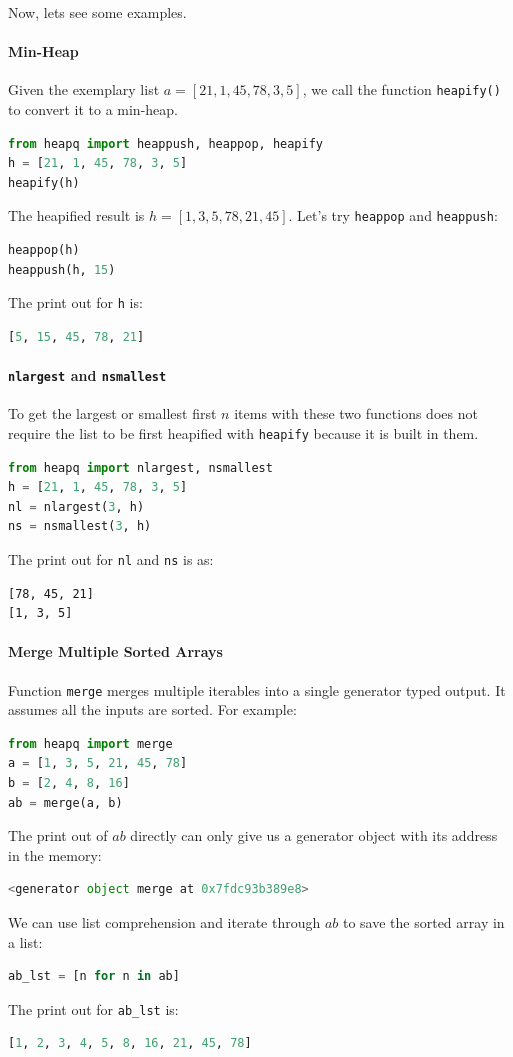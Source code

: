 \documentclass[../main.tex]{subfiles}
\begin{document}
Now, lets see some examples. 
\paragraph{Min-Heap} Given the exemplary list $a =[21, 1, 45, 78, 3, 5]$, we call the function \texttt{heapify()} to convert it to a min-heap. 
\begin{lstlisting}[language = Python]
from heapq import heappush, heappop, heapify
h = [21, 1, 45, 78, 3, 5]
heapify(h)
\end{lstlisting}
The heapified result is $h=[1, 3, 5, 78, 21, 45]$. Let's try \texttt{heappop} and \texttt{heappush}:
\begin{lstlisting}[language=Python]
heappop(h)
heappush(h, 15)
\end{lstlisting}
The print out for \texttt{h} is:
\begin{lstlisting}[language=Python]
[5, 15, 45, 78, 21]
\end{lstlisting}

\paragraph{\texttt{nlargest} and \texttt{nsmallest}}
To get the largest or smallest first $n$ items with these two functions does not require the list to be first heapified with \texttt{heapify} because it is built in them.
\begin{lstlisting}[language=Python]
from heapq import nlargest, nsmallest
h = [21, 1, 45, 78, 3, 5]
nl = nlargest(3, h)
ns = nsmallest(3, h)
\end{lstlisting}
The print out for \texttt{nl} and \texttt{ns} is as:
\begin{lstlisting}
[78, 45, 21]
[1, 3, 5]
\end{lstlisting}

\paragraph{Merge Multiple Sorted Arrays}  Function \texttt{merge} merges multiple iterables into a single generator typed output. It assumes all the inputs are sorted. For example:
\begin{lstlisting}[language=Python]
from heapq import merge
a = [1, 3, 5, 21, 45, 78]
b = [2, 4, 8, 16]
ab = merge(a, b)
\end{lstlisting}
The print out of $ab$ directly can only give us a generator object with its address in the memory:
\begin{lstlisting}[language=Python]
<generator object merge at 0x7fdc93b389e8>
\end{lstlisting}
We can use list comprehension and iterate through $ab$ to save the sorted array in a list:
\begin{lstlisting}[language=Python]
ab_lst = [n for n in ab]
\end{lstlisting}
The print out for \texttt{ab\_lst} is:
\begin{lstlisting}[language=Python]
[1, 2, 3, 4, 5, 8, 16, 21, 45, 78]
\end{lstlisting}
\end{document}
